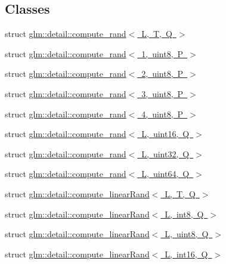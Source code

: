 \subsection*{Classes}
\begin{DoxyCompactItemize}
\item 
struct \mbox{\hyperlink{structglm_1_1detail_1_1compute__rand}{glm\+::detail\+::compute\+\_\+rand$<$ L, T, Q $>$}}
\item 
struct \mbox{\hyperlink{structglm_1_1detail_1_1compute__rand_3_011_00_01uint8_00_01_p_01_4}{glm\+::detail\+::compute\+\_\+rand$<$ 1, uint8, P $>$}}
\item 
struct \mbox{\hyperlink{structglm_1_1detail_1_1compute__rand_3_012_00_01uint8_00_01_p_01_4}{glm\+::detail\+::compute\+\_\+rand$<$ 2, uint8, P $>$}}
\item 
struct \mbox{\hyperlink{structglm_1_1detail_1_1compute__rand_3_013_00_01uint8_00_01_p_01_4}{glm\+::detail\+::compute\+\_\+rand$<$ 3, uint8, P $>$}}
\item 
struct \mbox{\hyperlink{structglm_1_1detail_1_1compute__rand_3_014_00_01uint8_00_01_p_01_4}{glm\+::detail\+::compute\+\_\+rand$<$ 4, uint8, P $>$}}
\item 
struct \mbox{\hyperlink{structglm_1_1detail_1_1compute__rand_3_01_l_00_01uint16_00_01_q_01_4}{glm\+::detail\+::compute\+\_\+rand$<$ L, uint16, Q $>$}}
\item 
struct \mbox{\hyperlink{structglm_1_1detail_1_1compute__rand_3_01_l_00_01uint32_00_01_q_01_4}{glm\+::detail\+::compute\+\_\+rand$<$ L, uint32, Q $>$}}
\item 
struct \mbox{\hyperlink{structglm_1_1detail_1_1compute__rand_3_01_l_00_01uint64_00_01_q_01_4}{glm\+::detail\+::compute\+\_\+rand$<$ L, uint64, Q $>$}}
\item 
struct \mbox{\hyperlink{structglm_1_1detail_1_1compute__linear_rand}{glm\+::detail\+::compute\+\_\+linear\+Rand$<$ L, T, Q $>$}}
\item 
struct \mbox{\hyperlink{structglm_1_1detail_1_1compute__linear_rand_3_01_l_00_01int8_00_01_q_01_4}{glm\+::detail\+::compute\+\_\+linear\+Rand$<$ L, int8, Q $>$}}
\item 
struct \mbox{\hyperlink{structglm_1_1detail_1_1compute__linear_rand_3_01_l_00_01uint8_00_01_q_01_4}{glm\+::detail\+::compute\+\_\+linear\+Rand$<$ L, uint8, Q $>$}}
\item 
struct \mbox{\hyperlink{structglm_1_1detail_1_1compute__linear_rand_3_01_l_00_01int16_00_01_q_01_4}{glm\+::detail\+::compute\+\_\+linear\+Rand$<$ L, int16, Q $>$}}
\item 

\end{DoxyCompactItemize}
